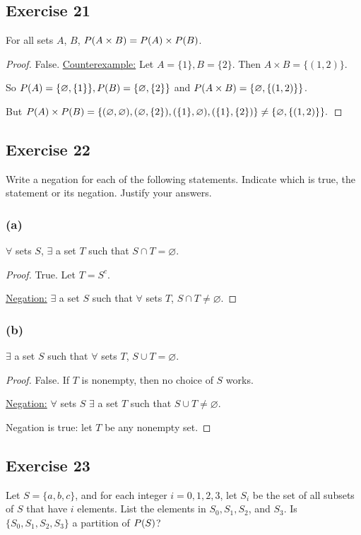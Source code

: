\documentclass[14pt]{extarticle}
\let\mathscr\relax
\newcommand{\ps}{\mathscr{P}}
\newcommand{\es}{\varnothing}
\begin{document}
\subsection{Exercise 21}
For all sets $A$, $B$, \(\ps(A \times B) = \ps(A) \times \ps(B)\).

\begin{proof}
  False. \underline{Counterexample:} Let \(A = \{1\}, B = \{2\}\). Then \(A \times B = \{(1, 2)\}\).

  So \(\ps(A) =
  \{\es, \{1\}\}, \ps(B) = \{\es, \{2\}\}\) and \(\ps(A \times B) = \{\es, \{(1, 2)\}\}\).

  But \(\ps(A) \times \ps(B) = \{(\es, \es), (\es, \{2\}), (\{1\}, \es), (\{1\}, \{2\})\} \neq \{\es, \{(1, 2)\}\}.\)
\end{proof}

\subsection{Exercise 22}
Write a negation for each of the following statements. Indicate which is true, the statement or its negation.
Justify your answers.

\subsubsection{(a)}
\(\forall\) sets $S$, \(\exists\) a set $T$ such that \(S \cap T = \es\).

\begin{proof}
  True. Let $T = S^c$.

  \underline{Negation:} \(\exists\) a set $S$ such that \( \forall\) sets $T$, \(S \cap T \neq \es\).
\end{proof}

\subsubsection{(b)}
\(\exists\) a set $S$ such that \(\forall\) sets $T$, \(S \cup T = \es\).

\begin{proof}
  False. If $T$ is nonempty, then no choice of $S$ works.

  \underline{Negation:} \(\forall\) sets $S$ \(\exists\) a set $T$ such that \(S \cup T \neq \es\).

  Negation is true: let $T$ be any nonempty set.
\end{proof}

\subsection{Exercise 23}
Let \(S = \{a, b, c\}\), and for each integer \(i = 0, 1, 2, 3\), let $S_i$ be the set of all subsets of $S$ that
have $i$ elements. List the elements in \(S_0, S_1, S_2\), and $S_3$. Is \(\{S_0, S_1, S_2, S_3\}\) a partition of $\ps(S)$?
\end{document}
